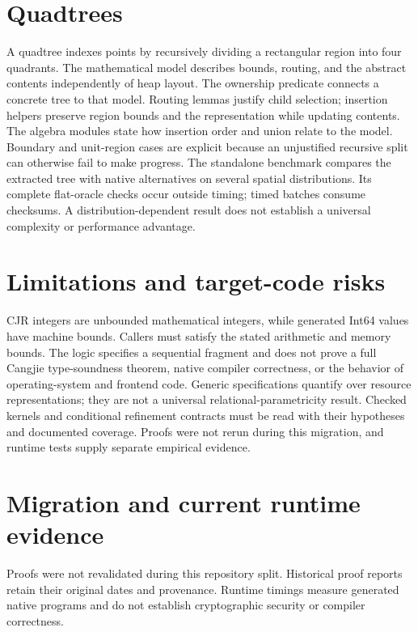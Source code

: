 \documentclass[11pt]{article}
\begin{document}
\section{Quadtrees}
A quadtree indexes points by recursively dividing a rectangular region into
four quadrants. The mathematical model describes bounds, routing, and the
abstract contents independently of heap layout. The ownership predicate
connects a concrete tree to that model. Routing lemmas justify child selection;
insertion helpers preserve region bounds and the representation while
updating contents. The algebra modules state how insertion order and union
relate to the model. Boundary and unit-region cases are explicit because an
unjustified recursive split can otherwise fail to make progress.
The standalone benchmark compares the extracted tree with native alternatives
on several spatial distributions. Its complete flat-oracle checks occur
outside timing; timed batches consume checksums. A distribution-dependent
result does not establish a universal complexity or performance advantage.




\section{Limitations and target-code risks}
\label{sec:limitations}
CJR integers are unbounded mathematical integers, while generated Int64 values
have machine bounds. Callers must satisfy the stated arithmetic and memory
bounds. The logic specifies a sequential fragment and does not prove a full
Cangjie type-soundness theorem, native compiler correctness, or the behavior
of operating-system and frontend code. Generic specifications quantify over
resource representations; they are not a universal relational-parametricity
result. Checked kernels and conditional refinement contracts must be read
with their hypotheses and documented coverage. Proofs were not rerun during
this migration, and runtime tests supply separate empirical evidence.

\section{Migration and current runtime evidence}
Proofs were not revalidated during this repository split. Historical proof reports retain their original dates and provenance. Runtime timings measure generated native programs and do not establish cryptographic security or compiler correctness.

\end{document}
